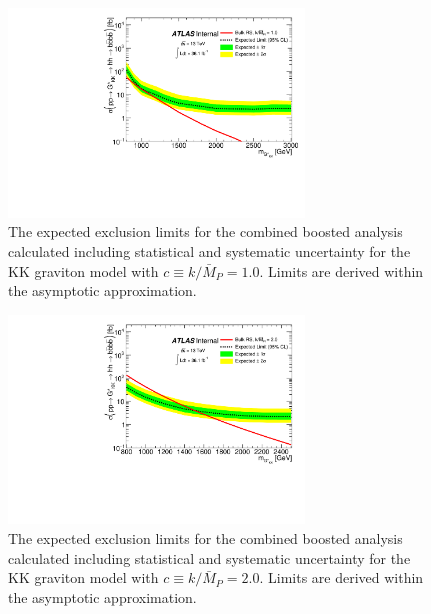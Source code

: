 \begin{figure}
\begin{center}
\includegraphics[width=0.7\textwidth,angle=-90]{figures/boosted/Limit_Stat/BrazilPlot_Asymptotic_RSGC10_merged.pdf}
\caption{The expected exclusion limits for the combined boosted analysis calculated including statistical and systematic uncertainty for the KK graviton model with $c \equiv k/\bar{M}_P = 1.0$. Limits are derived within the asymptotic approximation.}
\label{fig:brazil_hh_boosted_all_c10_syst}
\end{center}
\end{figure}

\begin{figure}
\begin{center}
\includegraphics[width=0.7\textwidth,angle=-90]{figures/boosted/Limit_Stat/BrazilPlot_Asymptotic_RSGC20_merged.pdf}
\caption{The expected exclusion limits for the combined boosted analysis calculated including statistical and systematic uncertainty for the KK graviton model with $c \equiv k/\bar{M}_P = 2.0$. Limits are derived within the asymptotic approximation.}
\label{fig:brazil_hh_boosted_all_c20_syst}
\end{center}
\end{figure}

